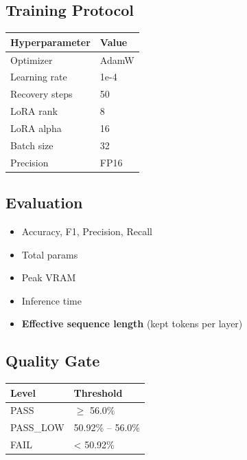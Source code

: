 \subsection{Training Protocol}

\begin{table}[H]
\centering
\small
\begin{tabular}{ll}
\toprule
\textbf{Hyperparameter} & \textbf{Value} \\
\midrule
Optimizer & AdamW \\
Learning rate & 1e-4 \\
Recovery steps & 50 \\
LoRA rank & 8 \\
LoRA alpha & 16 \\
Batch size & 32 \\
Precision & FP16 \\
\bottomrule
\end{tabular}
\end{table}

\subsection{Evaluation}

\begin{itemize}
\item Accuracy, F1, Precision, Recall
\item Total params
\item Peak VRAM
\item Inference time
\item \textbf{Effective sequence length} (kept tokens per layer)

\end{itemize}
\subsection{Quality Gate}

\begin{table}[H]
\centering
\small
\begin{tabular}{ll}
\toprule
\textbf{Level} & \textbf{Threshold} \\
\midrule
PASS & $\ge$ 56.0\% \\
PASS\_LOW & 50.92\% -- 56.0\% \\
FAIL & < 50.92\% \\
\bottomrule
\end{tabular}
\end{table}

